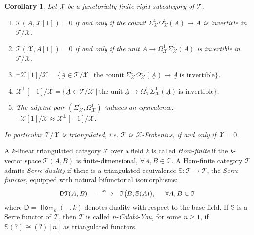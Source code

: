 \documentclass[oneside, a4paper,reqno]{amsart}
\numberwithin{equation}{section}
\newtheorem{cor}[thm]{Corollary}
\theoremstyle{definition}
\begin{document}
\begin{cor} Let ${\mathcal X}$ be a functorially finite rigid subcategory of ${\mathcal T}$.
\begin{enumerate}
\item ${\mathcal T}(A,{\mathcal X}[1]) = 0$ if and only if the counit $\Sigma^{1}_{\mathcal X}\Omega^{1}_{\mathcal X}(A) {\longrightarrow} A$ is invertible in ${\mathcal T}/{\mathcal X}$. 
\item ${\mathcal T}({\mathcal X},A[1]) = 0$ if and only if  the unit $A {\longrightarrow} \Omega^{1}_{\mathcal X}\Sigma^{1}_{\mathcal X}(A)$ is invertible in ${\mathcal T}/{\mathcal X}$.
\item ${^{\bot}}{\mathcal X}[1]/{\mathcal X} = \big\{{\underline A} \in {\mathcal T}/{\mathcal X} \ | \ \text{the counit}  \ \Sigma^{1}_{\mathcal X}\Omega^{1}_{\mathcal X}({\underline A}) {\longrightarrow} {\underline A} \ \text{is invertible}\big\}$.
\item ${\mathcal X}^{\bot}[-1]/{\mathcal X} = \big\{{\underline A} \in {\mathcal T}/{\mathcal X} \ | \ \text{the unit}  \ {\underline A} {\longrightarrow} \Omega^{1}_{\mathcal X}\Sigma^{1}_{\mathcal X}({\underline A}) \ \text{is invertible}\big\}$.
\item The adjoint pair $(\Sigma^{1}_{\mathcal X}, \Omega^{1}_{\mathcal X})$ induces an equivalence: ${^{\bot}}{\mathcal X}[1]/{\mathcal X} \approx {\mathcal X}^{\bot}[-1]/{\mathcal X}$. 
\end{enumerate}
In particular ${\mathcal T}/{\mathcal X}$ is triangulated, i.e. ${\mathcal T}$ is ${\mathcal X}$-Frobenius,  if and only if ${\mathcal X} = 0$. 
\end{cor}

A $k$-linear triangulated category ${\mathcal T}$ over a field $k$ is called {\em Hom-finite} if the $k$-vector space ${\mathcal T}(A,B)$ is finite-dimensional, $\forall A,B \in {\mathcal T}$. A Hom-finite category ${\mathcal T}$ admits {\em Serre duality} if there is a triangulated equivalence $\mathbb S \colon {\mathcal T} {\longrightarrow} {\mathcal T}$, the {\em Serre functor}, equipped with natural bifunctorial  isomorphisms: 
\[
\begin{CD}
\mathsf{D}{\mathcal T}(A,B)  \,\, @> \approx >> \,\, {\mathcal T}\big(B,\mathbb S(A)\big), \,\,\,\,\,\,\ \forall A, B \in {\mathcal T}
\end{CD}
\]
where $\mathsf{D} = \operatorname{\mathsf{Hom}}_{k}(-,k)$ denotes duality with respect to the base field. If $\mathbb S$ is a Serre functor of ${\mathcal T}$, then ${\mathcal T}$ is called $n$-{\em Calabi-Yau}, for some $n \geq 1$, if $\mathbb S(?) \cong (?)[n]$ as triangulated functors.   
\end{document}

